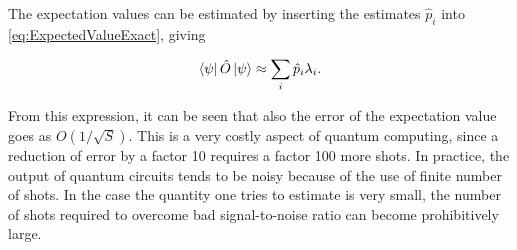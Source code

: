 The expectation values can be estimated by inserting the estimates $\hat{p}_i$ into \autoref{eq:ExpectedValueExact}, giving

\begin{equation}\label{eq:ExpectedValueEstimate}
    \bra{\psi}\hat{O}\ket{\psi} \approx \sum_{i} \hat{p}_i\lambda_i.
\end{equation}

From this expression, it can be seen that also the error of the expectation value goes as $O(1/\sqrt{S})$. This is a very costly aspect of quantum computing, since a reduction of error by a factor 10  requires a factor 100 more shots. In practice, the output of quantum circuits tends to be noisy because of the use of finite number of shots. In the case the quantity one tries to estimate is very small, the number of shots required to overcome bad signal-to-noise ratio can become prohibitively large.






